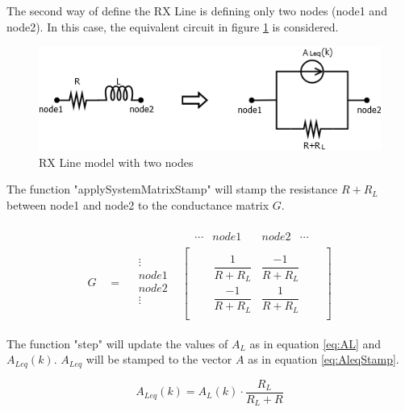 The second way of define the RX Line is defining only two nodes (node1 and node2). In this case, the equivalent circuit in figure \ref{fig:RxLine2} is considered.

\begin{figure}[ht]
	\centering
	\includegraphics[scale=0.5]{img/RxLine2.png} 
	\caption{RX Line model with two nodes}
	\label{fig:RxLine2}
\end{figure}

The function "applySystemMatrixStamp" will stamp the resistance $R+R_L$ between node1 and node2 to the conductance matrix $G$.

\begin{align}
\begin{split}
&
\begin{matrix}
& \cdots & node1 & \quad node2 & \cdots
\end{matrix}\\[-5pt]
G \quad = \quad
\begin{matrix}
\vdots\\[6pt]
node1\\[6pt]
node2\\[6pt]
\vdots\\
\end{matrix}
&
\begin{bmatrix}
	\quad & \quad &  \\[6pt]
	\quad & \dfrac{1}{R+R_L} & \dfrac{-1}{R+R_L} & \quad  \\[6pt]
	\quad & \dfrac{-1}{R+R_L} & \dfrac{1}{R+R_L} & \quad \\[6pt]
	\quad &  & 
\end{bmatrix}
\end{split}
\end{align}

The function "step" will update the values of $A_L$ as in equation \ref{eq:AL} and $A_{Leq}(k)$. $A_{Leq}$ will be stamped to the vector $A$ as in equation \ref{eq:AleqStamp}.

\begin{equation}
A_{Leq}(k)=A_L(k) \cdot \frac{R_L}{R_L+R}
\end{equation}

